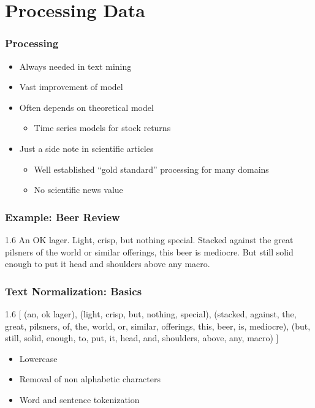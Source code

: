 
 \section{Processing Data}
\begin{frame}
    \frametitle{Processing}
    \begin{itemize}
        \item Always needed in text mining
        \item Vast improvement of model
    \end{itemize}

    \begin{itemize}
        \item Often depends on theoretical model
        \begin{itemize}
            \item Time series models for stock returns
        \end{itemize}
    \end{itemize}
    \begin{itemize}
        \item Just a side note in scientific articles
        \begin{itemize}
            \item Well established ``gold standard'' processing for many domains
            \item No scientific news value
        \end{itemize}
    \end{itemize}
\end{frame}

\begin{frame}
    \frametitle{Example: Beer Review}
    \label{beer_review}
\begin{spacing}{1.6}
    An OK lager. Light, crisp, but nothing special. Stacked against the great pilsners of the world or similar offerings, this beer is mediocre. But still solid enough to put it head and shoulders above any macro. 
\end{spacing}
\begin{flushright}
\hyperlink{text_all}{}
\end{flushright}
\end{frame}

\begin{frame}
    \frametitle{Text Normalization: Basics}
\begin{spacing}{1.6}
    [ (an, ok lager), (light, crisp, but, nothing, special), (stacked, against, the, great, pilsners, of, the, world, or, similar, offerings, this, beer, is, mediocre), (but, still, solid, enough, to, put, it, head, and, shoulders, above, any, macro) ]
\end{spacing}
\vspace{10pt}
\begin{itemize}
\item Lowercase
\item Removal of non alphabetic characters
\item Word and sentence tokenization
\end{itemize}
\end{frame}

